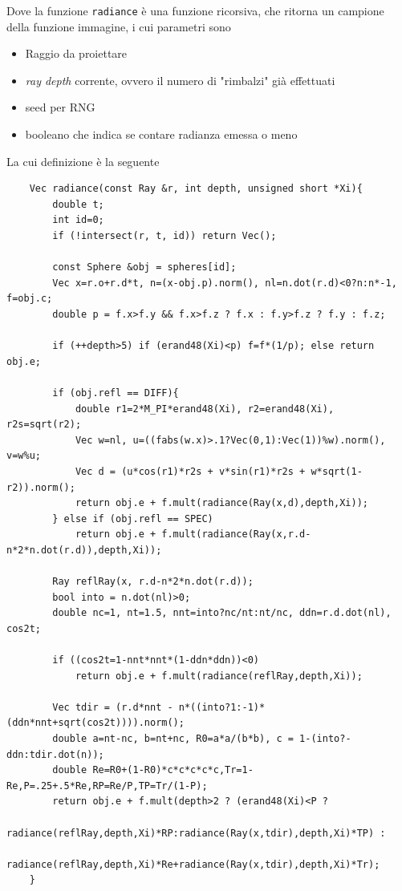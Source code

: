 Dove la funzione \texttt{radiance} \`e una funzione ricorsiva, che ritorna un campione della funzione immagine, i cui parametri sono
\begin{itemize}[topsep=0pt,noitemsep]
	\item Raggio da proiettare
	\item \textit{ray depth} corrente, ovvero il numero di "rimbalzi" gi\`a effettuati
	\item seed per RNG
	\item booleano che indica se contare radianza emessa o meno
\end{itemize}
La cui definizione \`e la seguente
\begin{verbatim}
	Vec radiance(const Ray &r, int depth, unsigned short *Xi){ 
		double t;                               
		int id=0;                               
		if (!intersect(r, t, id)) return Vec(); 

		const Sphere &obj = spheres[id];        
		Vec x=r.o+r.d*t, n=(x-obj.p).norm(), nl=n.dot(r.d)<0?n:n*-1, f=obj.c; 
		double p = f.x>f.y && f.x>f.z ? f.x : f.y>f.z ? f.y : f.z; 

		if (++depth>5) if (erand48(Xi)<p) f=f*(1/p); else return obj.e; 

		if (obj.refl == DIFF){                  
			double r1=2*M_PI*erand48(Xi), r2=erand48(Xi), r2s=sqrt(r2); 
			Vec w=nl, u=((fabs(w.x)>.1?Vec(0,1):Vec(1))%w).norm(), v=w%u; 
			Vec d = (u*cos(r1)*r2s + v*sin(r1)*r2s + w*sqrt(1-r2)).norm(); 
			return obj.e + f.mult(radiance(Ray(x,d),depth,Xi)); 
		} else if (obj.refl == SPEC)            
			return obj.e + f.mult(radiance(Ray(x,r.d-n*2*n.dot(r.d)),depth,Xi)); 

		Ray reflRay(x, r.d-n*2*n.dot(r.d));     
		bool into = n.dot(nl)>0;                
		double nc=1, nt=1.5, nnt=into?nc/nt:nt/nc, ddn=r.d.dot(nl), cos2t; 

		if ((cos2t=1-nnt*nnt*(1-ddn*ddn))<0)    
			return obj.e + f.mult(radiance(reflRay,depth,Xi)); 

		Vec tdir = (r.d*nnt - n*((into?1:-1)*(ddn*nnt+sqrt(cos2t)))).norm(); 
		double a=nt-nc, b=nt+nc, R0=a*a/(b*b), c = 1-(into?-ddn:tdir.dot(n)); 
		double Re=R0+(1-R0)*c*c*c*c*c,Tr=1-Re,P=.25+.5*Re,RP=Re/P,TP=Tr/(1-P); 
		return obj.e + f.mult(depth>2 ? (erand48(Xi)<P ?   
			radiance(reflRay,depth,Xi)*RP:radiance(Ray(x,tdir),depth,Xi)*TP) : 
			radiance(reflRay,depth,Xi)*Re+radiance(Ray(x,tdir),depth,Xi)*Tr); 
	} 
\end{verbatim}
